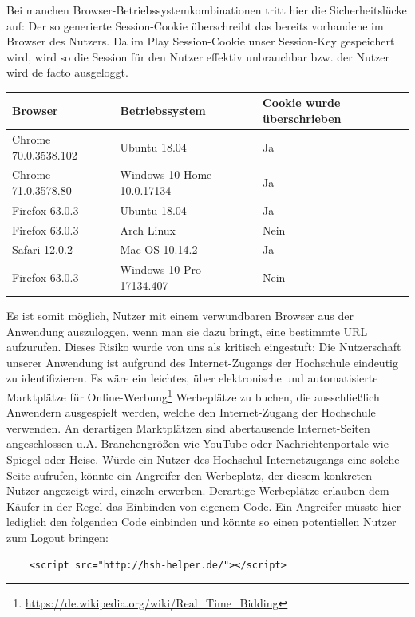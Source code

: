 \documentclass[12pt,DIV14,BCOR10mm,a4paper,parskip=half-,headsepline,headinclude,english,ngerman,bibliography=totocnumbered]{scrreprt}
\begin{document}
Bei manchen Browser-Betriebssystemkombinationen tritt hier die Sicherheitslücke auf: Der so generierte Session-Cookie überschreibt das bereits vorhandene im Browser des Nutzers. Da im Play Session-Cookie unser Session-Key gespeichert wird, wird so die Session für den Nutzer effektiv unbrauchbar bzw. der Nutzer wird de facto ausgeloggt.

\begin{center}
    \begin{tabular}{ | l | l | l | }
    \hline
    	Browser & Betriebssystem & Cookie wurde überschrieben \\ \hline
    	Chrome 70.0.3538.102 & Ubuntu 18.04 & Ja \\ \hline
    	Chrome 71.0.3578.80 & Windows 10 Home 10.0.17134 & Ja \\ \hline
    	Firefox 63.0.3 & Ubuntu 18.04 & Ja \\ \hline
    	Firefox 63.0.3 & Arch Linux & Nein \\ \hline
    	Safari 12.0.2 & Mac OS 10.14.2 & Ja \\ \hline
    	Firefox 63.0.3 & Windows 10 Pro 17134.407 & Nein \\ \hline
    \end{tabular}
\end{center}

Es ist somit möglich, Nutzer mit einem verwundbaren Browser aus der Anwendung auszuloggen, wenn man sie dazu bringt, eine bestimmte URL aufzurufen. Dieses Risiko wurde von uns als kritisch eingestuft: Die Nutzerschaft unserer Anwendung ist aufgrund des Internet-Zugangs der Hochschule eindeutig zu identifizieren. Es wäre ein leichtes, über elektronische und automatisierte Marktplätze für Online-Werbung\footnote{\url{https://de.wikipedia.org/wiki/Real_Time_Bidding}} Werbeplätze zu buchen, die ausschließlich Anwendern ausgespielt werden, welche den Internet-Zugang der Hochschule verwenden. An derartigen Marktplätzen sind abertausende Internet-Seiten angeschlossen u.A. Branchengrößen wie YouTube oder Nachrichtenportale wie Spiegel oder Heise. Würde ein Nutzer des Hochschul-Internetzugangs eine solche Seite aufrufen, könnte ein Angreifer den Werbeplatz, der diesem konkreten Nutzer angezeigt wird, einzeln erwerben. Derartige Werbeplätze erlauben dem Käufer in der Regel das Einbinden von eigenem Code. Ein Angreifer müsste hier lediglich den folgenden Code einbinden und könnte so einen potentiellen Nutzer zum Logout bringen:

\begin{lstlisting}
	<script src="http://hsh-helper.de/"></script>
\end{lstlisting}
\end{document}
